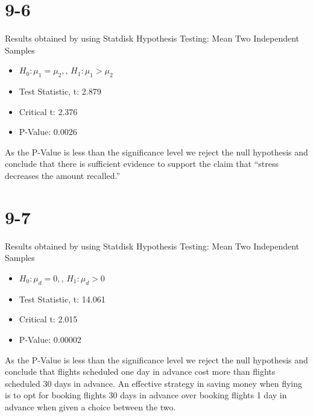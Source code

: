 \documentclass[12pt,fleqn]{article}
\newcommand{\chapter}{9}
\newcommand{\problem}[1]{\vspace{5ex}\section*{\chapter-#1}}
\begin{document}
\problem{6}
Results obtained by using Statdisk Hypothesis Testing: Mean Two Independent Samples
\begin{itemize}
\item $H_0: \mu_1 = \mu_2, $, $H_1: \mu_1 > \mu_2$
\item Test Statistic, t: 2.879
\item Critical t: 2.376
\item P-Value: 0.0026
\end{itemize}
As the P-Value is less than the significance level we reject the null hypothesis and conclude that there is sufficient evidence to support the claim that ``stress decreases the amount recalled.''



\problem{7}
Results obtained by using Statdisk Hypothesis Testing: Mean Two Independent Samples
\begin{itemize}
\item $H_0: \mu_d = 0, $, $H_1: \mu_d > 0$
\item Test Statistic, t: 14.061
\item Critical t: 2.015
\item P-Value: 0.00002
\end{itemize}
As the P-Value is less than the significance level we reject the null hypothesis and conclude that flights scheduled one day in advance cost more than flights scheduled 30 days in advance. An effective strategy in saving money when flying is to opt for booking flights 30 days in advance over booking flights 1 day in advance when given a choice between the two.
\end{document}
